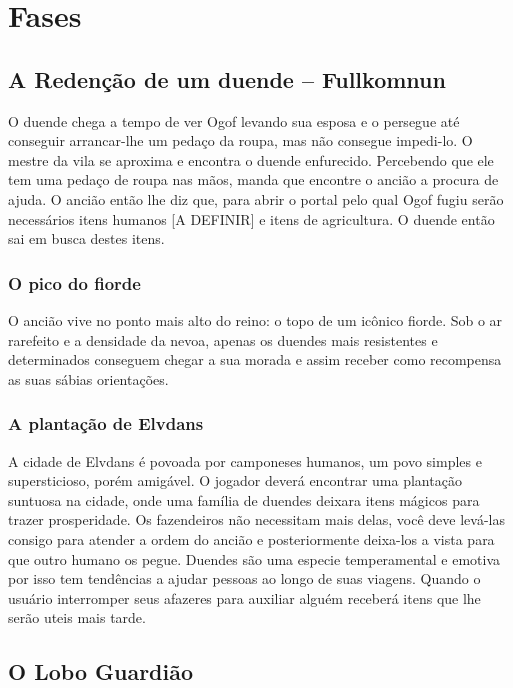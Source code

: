 

\section{Fases}

\subsection{A Redenção de um duende -- Fullkomnun}
O duende chega a tempo de ver Ogof levando sua esposa e o persegue até conseguir arrancar-lhe um pedaço da roupa, mas não consegue impedi-lo. O mestre da vila se aproxima e encontra o duende enfurecido. Percebendo que ele tem uma pedaço de roupa nas mãos,  manda que encontre o ancião a procura de ajuda.
O ancião então lhe diz que, para abrir o portal pelo qual Ogof fugiu serão necessários itens humanos [A DEFINIR] e itens de agricultura. O duende então sai em busca destes itens.

\subsubsection{O pico do fiorde}
O  ancião vive no ponto mais alto do reino: o topo de um icônico fiorde. Sob o ar rarefeito e a densidade da nevoa, apenas os duendes mais resistentes e determinados conseguem chegar a sua morada e assim receber como recompensa as suas sábias orientações.

\subsubsection{A plantação de Elvdans}
A cidade de Elvdans é povoada por camponeses humanos, um povo simples e supersticioso, porém amigável. O jogador deverá encontrar uma plantação suntuosa na cidade, onde uma família de duendes deixara itens mágicos para trazer prosperidade. Os fazendeiros não necessitam mais delas, você deve levá-las consigo para atender a ordem do ancião e posteriormente deixa-los a vista para que outro humano os pegue. Duendes são uma especie temperamental e emotiva por isso tem tendências a ajudar pessoas ao longo de suas viagens. Quando o usuário interromper seus afazeres para auxiliar alguém receberá itens que lhe serão uteis mais tarde.

\subsection{O Lobo Guardião}

